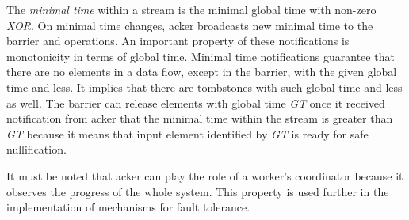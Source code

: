 The {\em minimal time} within a stream is the minimal global time with non-zero {\it XOR}. On minimal time changes, acker broadcasts new minimal time to the barrier and operations. An important property of these notifications is monotonicity in terms of global time. Minimal time notifications guarantee that there are no elements in a data flow, except in the barrier, with the given global time and less. It implies that there are tombstones with such global time and less as well. The barrier can release elements with global time {\it GT} once it received notification from acker that the minimal time within the stream is greater than {\it GT} because it means that input element identified by {\it GT} is ready for safe nullification. 

It must be noted that acker can play the role of a worker's coordinator because it observes the progress of the whole system. This property is used further in the implementation of mechanisms for fault tolerance. 